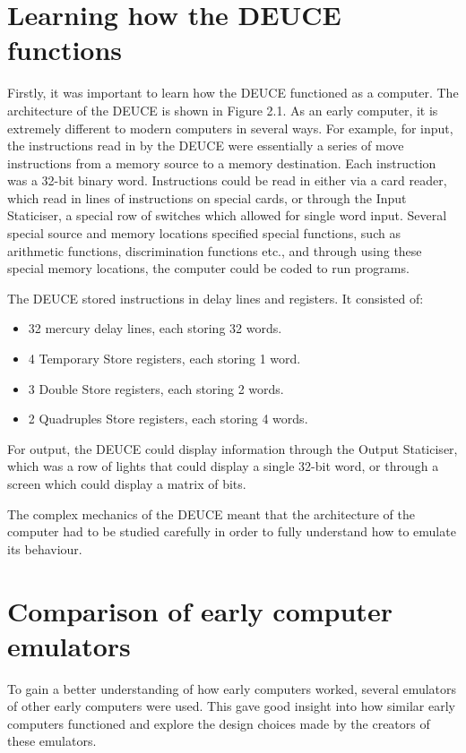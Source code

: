 \documentclass{l4proj}
\begin{document}
\section{Learning how the DEUCE functions}
Firstly, it was important to learn how the DEUCE functioned as a computer. The architecture of the DEUCE is shown in Figure 2.1. As an early computer, it is extremely different to modern computers in several ways. For example, for input, the instructions read in by the DEUCE were essentially a series of move instructions from a memory source to a memory destination. Each instruction was a 32-bit binary word. Instructions could be read in either via a card reader, which read in lines of instructions on special cards, or through the Input Staticiser, a special row of switches which allowed for single word input. Several special source and memory locations specified special functions, such as arithmetic functions, discrimination functions etc., and through using these special memory locations, the computer could be coded to run programs.

The DEUCE stored instructions in delay lines and registers. It consisted of:
\begin{itemize}
	\item 32 mercury delay lines, each storing 32 words.
	\item 4 Temporary Store registers, each storing 1 word.
	\item 3 Double Store registers, each storing 2 words.
	\item 2 Quadruples Store registers, each storing 4 words.
\end{itemize}	
For output, the DEUCE could display information through the Output Staticiser, which was a row of lights that could display a single 32-bit word, or through a screen which could display a matrix of bits.

The complex mechanics of the DEUCE meant that the architecture of the computer had to be studied carefully in order to fully understand how to emulate its behaviour.

\section{Comparison of early computer emulators}
To gain a better understanding of how early computers worked, several emulators of other early computers were used. This gave good insight into how similar early computers functioned and explore the design choices made by the creators of these emulators.
\end{document}
